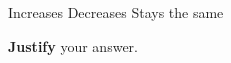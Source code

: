 \documentclass{../../../oss-apphys-exam}
\begin{document}
\begin{questions}
\begin{parts}
    \vspace{.15in}
    \underline{\hspace{.4in}} Increases \hspace{.4in}
    \underline{\hspace{.4in}} Decreases \hspace{.4in}
    \underline{\hspace{.4in}} Stays the same

    \vspace{.1in}\textbf{Justify} your answer.
  \end{parts}
\end{questions}
\end{document}
